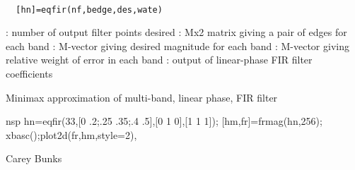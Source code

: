 
\begin{mandesc}
   \\ %
\end{mandesc}
\begin{calling_sequence}
\begin{verbatim}
  [hn]=eqfir(nf,bedge,des,wate)  
\end{verbatim}
\end{calling_sequence}
\begin{parameters}
  \begin{varlist}
    : number of output filter points desired
    : Mx2 matrix giving a pair of edges for each band
    : M-vector giving desired magnitude for each band
    : M-vector giving relative weight of error in each band
    : output of linear-phase FIR filter coefficients
  \end{varlist}
\end{parameters}
\begin{mandescription}
  Minimax approximation of multi-band, linear phase, FIR filter
\end{mandescription}
\begin{examples}
  \begin{mintednsp}{nsp}
    hn=eqfir(33,[0 .2;.25 .35;.4 .5],[0 1 0],[1 1 1]);
    [hm,fr]=frmag(hn,256);
    xbasc();plot2d(fr,hm,style=2),
  \end{mintednsp}
\end{examples}
\begin{authors}
    Carey Bunks  
\end{authors}
